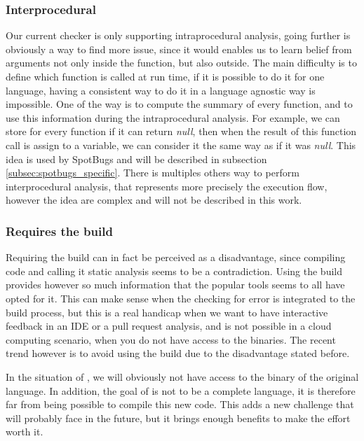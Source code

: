 \subsubsection{Interprocedural}
\label{subsubsec:inter_procedrual}

Our current checker is only supporting intraprocedural analysis, going further is obviously a way to find more issue, since it would enables us to learn belief from arguments not only inside the function, but also outside. 
The main difficulty is to define which function is called at run time, if it is possible to do it for one language, having a consistent way to do it in a language agnostic way is impossible. One of the way is to compute the summary of every function, and to use this information during the intraprocedural analysis. 
For example, we can store for every function if it can return \emph{null}, then when the result of this function call is assign to a variable, we can consider it the same way as if it was \emph{null}. 
This idea is used by SpotBugs and will be described in subsection \ref{subsec:spotbugs_specific}. 
There is multiples others way to perform interprocedural analysis, that represents more precisely the execution flow, however the idea are complex and will not be described in this work.

\subsubsection{Requires the build}
\label{subsubsec:require_build}

Requiring the build can in fact be perceived as a disadvantage, since compiling code and calling it static analysis seems to be a contradiction. 
Using the build provides however so much information that the popular tools seems to all have opted for it. 
This can make sense when the checking for error is integrated to the build process, but this is a real handicap when we want to have interactive feedback in an IDE or a pull request analysis, and is not possible in a cloud computing scenario, when you do not have access to the binaries. 
The recent trend however is to avoid using the build due to the disadvantage stated before.

In the situation of \slang{}, we will obviously not have access to the binary of the original language. 
In addition, the goal of \slang{} is not to be a complete language, it is therefore far from being possible to compile this new code. 
This adds a new challenge that \slang{} will probably face in the future, but it brings enough benefits to make the effort worth it.

